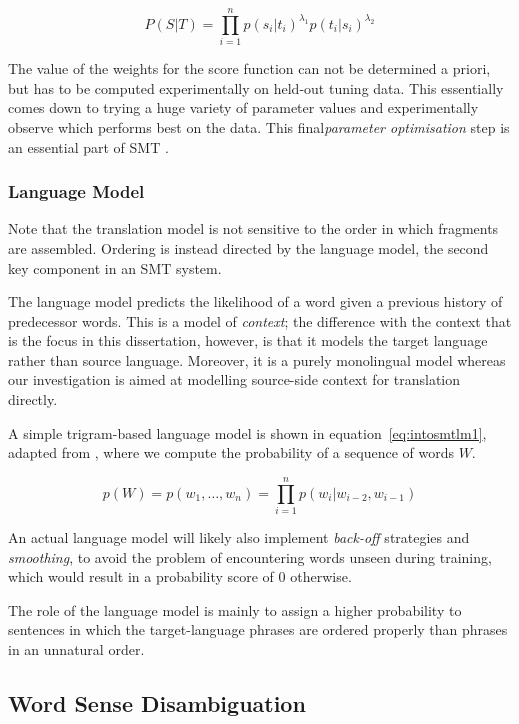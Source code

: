 \begin{equation}
P(S|T) = \prod_{i=1}^{n} p(s_i|t_i)^{\lambda_1} p(t_i|s_i)^{\lambda_2}
\label{eq:introsmt3}
\end{equation}

The value of the weights for the score function can not be determined a priori,
but has to be computed experimentally on held-out tuning data. This essentially
comes down to trying a huge variety of parameter values and experimentally
observe which performs best on the data.  This final\emph{parameter
optimisation} step is an essential part of SMT \citep{MERT}.

\subsubsection{Language Model}

Note that the translation model is not sensitive to the order in which
fragments are assembled. Ordering is instead directed by the language model,
the second key component in an SMT system.

The language model predicts the likelihood of a word given a previous history
of predecessor words. This is a model of \emph{context}; the difference with
the context that is the focus in this dissertation, however, is that it models
the target language rather than source language. Moreover, it is a purely
monolingual model whereas our investigation is aimed at modelling source-side
context for translation directly.

A simple trigram-based language model is shown in equation~\ref{eq:intosmtlm1}, adapted from
\cite{Cole1997}, where we compute the probability of a sequence of words $W$.

\begin{equation}
p(W) = p(w_1,\ldots,w_n) = \prod_{i=1}^{n} p(w_i|w_{i-2},w_{i-1})
\label{eq:introsmtlm1}
\end{equation}

An actual language model will likely also implement \emph{back-off} strategies and
\emph{smoothing}, to avoid the problem of encountering words unseen during
training, which would result in a probability score of $0$ otherwise. 

The role of the language model is mainly to assign a higher probability to
sentences in which the target-language phrases are ordered properly than
phrases in an unnatural order. 

\subsection{Word Sense Disambiguation}

